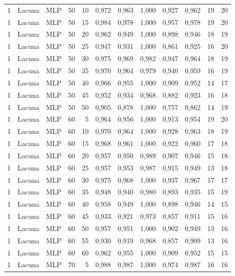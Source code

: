 \begin{longtable}{@{}rllrrrrrrrrr@{}}
1 & Lacuna & MLP & 50 & 10 & 0,972 & 0,963 & 1,000 & 0,927 & 0,962 & 19 & 20 \\
1 & Lacuna & MLP & 50 & 15 & 0,984 & 0,978 & 1,000 & 0,957 & 0,978 & 19 & 20 \\
1 & Lacuna & MLP & 50 & 20 & 0,962 & 0,949 & 1,000 & 0,898 & 0,946 & 18 & 19 \\
1 & Lacuna & MLP & 50 & 25 & 0,947 & 0,931 & 1,000 & 0,861 & 0,925 & 16 & 20 \\
1 & Lacuna & MLP & 50 & 30 & 0,975 & 0,969 & 0,982 & 0,947 & 0,964 & 18 & 19 \\
1 & Lacuna & MLP & 50 & 35 & 0,970 & 0,964 & 0,979 & 0,940 & 0,959 & 16 & 19 \\
1 & Lacuna & MLP & 50 & 40 & 0,966 & 0,955 & 1,000 & 0,909 & 0,952 & 14 & 17 \\
1 & Lacuna & MLP & 50 & 45 & 0,952 & 0,934 & 0,968 & 0,882 & 0,923 & 16 & 18 \\
1 & Lacuna & MLP & 50 & 50 & 0,905 & 0,878 & 1,000 & 0,757 & 0,862 & 14 & 19 \\
1 & Lacuna & MLP & 60 & 5 & 0,964 & 0,956 & 1,000 & 0,913 & 0,954 & 19 & 20 \\
1 & Lacuna & MLP & 60 & 10 & 0,970 & 0,964 & 1,000 & 0,928 & 0,963 & 18 & 19 \\
1 & Lacuna & MLP & 60 & 15 & 0,968 & 0,961 & 1,000 & 0,922 & 0,960 & 17 & 18 \\
1 & Lacuna & MLP & 60 & 20 & 0,957 & 0,950 & 0,989 & 0,907 & 0,946 & 15 & 18 \\
1 & Lacuna & MLP & 60 & 25 & 0,957 & 0,953 & 0,987 & 0,915 & 0,949 & 13 & 18 \\
1 & Lacuna & MLP & 60 & 30 & 0,975 & 0,968 & 1,000 & 0,937 & 0,967 & 17 & 17 \\
1 & Lacuna & MLP & 60 & 35 & 0,948 & 0,940 & 0,980 & 0,893 & 0,935 & 15 & 19 \\
1 & Lacuna & MLP & 60 & 40 & 0,958 & 0,949 & 1,000 & 0,898 & 0,946 & 14 & 15 \\
1 & Lacuna & MLP & 60 & 45 & 0,933 & 0,921 & 0,973 & 0,857 & 0,911 & 15 & 16 \\
1 & Lacuna & MLP & 60 & 50 & 0,957 & 0,951 & 1,000 & 0,902 & 0,949 & 13 & 16 \\
1 & Lacuna & MLP & 60 & 55 & 0,930 & 0,919 & 0,968 & 0,857 & 0,909 & 13 & 16 \\
1 & Lacuna & MLP & 60 & 60 & 0,962 & 0,955 & 1,000 & 0,909 & 0,952 & 15 & 15 \\
1 & Lacuna & MLP & 70 & 5 & 0,988 & 0,987 & 1,000 & 0,974 & 0,987 & 16 & 16 \\

\end{longtable}
